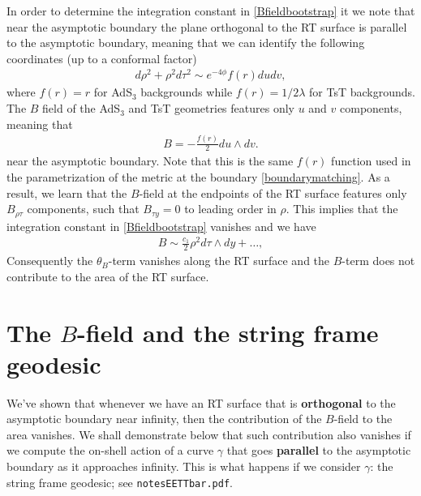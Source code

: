\documentclass[11pt,a4paper]{article}
\def\l{\lambda}
\def\we{\wedge}
\newcommand{\eq}[1]{\begin{align}#1\end{align}}
\begin{document}
In order to determine the integration constant in \eqref{Bfieldbootstrap} it we note that near the asymptotic boundary the plane orthogonal to the RT surface is parallel to the asymptotic boundary, meaning that we can identify the following coordinates (up to a conformal factor) 
\eq{
d\rho^2 + \rho^2 d\tau^2 \sim e^{-4\phi} f(r) du dv, \label{boundarymatching}
}
where $f(r) = r$ for AdS$_3$ backgrounds while $f(r) = 1/2\l$ for TsT backgrounds. The $B$ field of the AdS$_3$ and TsT geometries features only $u$ and $v$ components, meaning that
\eq{
B = - \frac{f(r)}{2} du \we dv.
}
near the asymptotic boundary. Note that this is the same $f(r)$ function used in the parametrization of the metric at the boundary \eqref{boundarymatching}. As a result, we learn that the $B$-field at the endpoints of the RT surface features only $B_{\rho\tau}$ components, such that $B_{\tau y} = 0$ to leading order in $\rho$. This implies that the integration constant in \eqref{Bfieldbootstrap} vanishes and we have
\eq{
B \sim \frac{c_1}{2}  \rho^2  d\tau \we dy + \dots, 
}
Consequently the $\theta_B$-term vanishes along the RT surface and the $B$-term does not contribute to the area of the RT surface.

\section{The $B$-field and the string frame geodesic}

We've shown that whenever we have an RT surface that is \textbf{orthogonal} to the asymptotic boundary near infinity, then the contribution of the $B$-field to the area vanishes. We shall demonstrate below that such contribution also vanishes if we compute the on-shell action of a curve $\gamma$ that goes \textbf{parallel} to the asymptotic boundary as it approaches infinity. This is what happens if we consider $\gamma$: the string frame geodesic; see \texttt{notesEETTbar.pdf}. 
\end{document}

